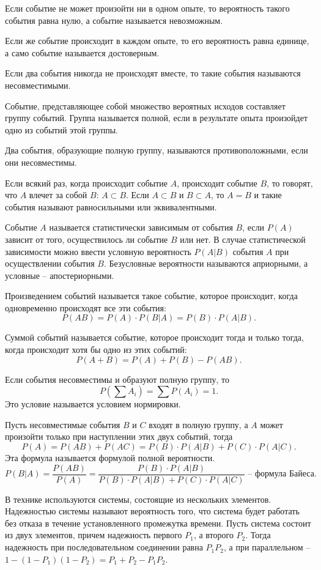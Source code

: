 Если событие не может произойти ни в одном опыте, то вероятность такого события
равна нулю, а событие называется невозможным.

Если же событие происходит в каждом опыте, то его вероятность равна единице, а
само событие называется достоверным.

Если два события никогда не происходят вместе, то такие события называются
несовместимыми.

Событие, представляющее собой множество вероятных исходов составляет группу
событий. Группа называется полной, если в результате опыта произойдет одно из
событий этой группы.

Два события, образующие полную группу, называются противоположными, если они
несовместимы.

Если всякий раз, когда происходит событие \( A \), происходит событие \( B \),
то говорят, что \( A \) влечет за собой \( B \): \( A \subset B \). Если
\( A \subset B \) и \( B \subset A \), то \( A = B \) и такие события называют
равносильными или эквивалентными.

Событие \( A \) называется статистически зависимым от события \( B \), если
\( P(A) \) зависит от того, осуществилось ли событие \( B \) или нет. В случае
статистической зависимости можно ввести условную вероятность \( P(A|B) \)
события \( A \) при осуществлении события \( B \). Безусловные вероятности
называются априорными, а условные -- апостериорными.

Произведением событий называется такое событие, которое происходит, когда
одновременно происходят все эти события:
\[
    P(AB) = P(A) \cdot P(B|A) = P(B) \cdot P(A|B).
\]

Суммой событий называется событие, которое происходит тогда и только тогда,
когда происходит хотя бы одно из этих событий:
\[
    P(A+B) = P(A) + P(B) - P(AB).
\]

Если события несовместимы и образуют полную группу, то
\[
    P(\sum A_i) = \sum P(A_i) = 1.
\]
Это условие называется условием нормировки.

Пусть несовместимые события \( B \) и \( C \) входят в полную группу, а \( A \)
может произойти только при наступлении этих двух событий, тогда
\[
    P(A) = P(AB) + P(AC) = P(B) \cdot P(A|B) + P(C) \cdot P(A|C).
\]
Эта формула называется формулой полной вероятности.
\[
    P(B|A) = \frac{P(AB)}{P(A)} = \frac{P(B) \cdot P(A|B)}
    {P(B) \cdot P(A|B) + P(C) \cdot P(A|C)} \text{ -- формула Байеса.}
\]

В технике используются системы, состоящие из нескольких элементов. Надежностью
системы называют вероятность того, что система будет работать без отказа в
течение установленного промежутка времени. Пусть система состоит из двух
элементов, причем надежность первого \( P_1 \), а второго \( P_2 \). Тогда
надежность при последовательном соединении равна \( P_1P_2 \),  а при
параллельном -- \( 1 - (1 - P_1)(1 - P_2) = P_1 + P_2 - P_1P_2 \).

